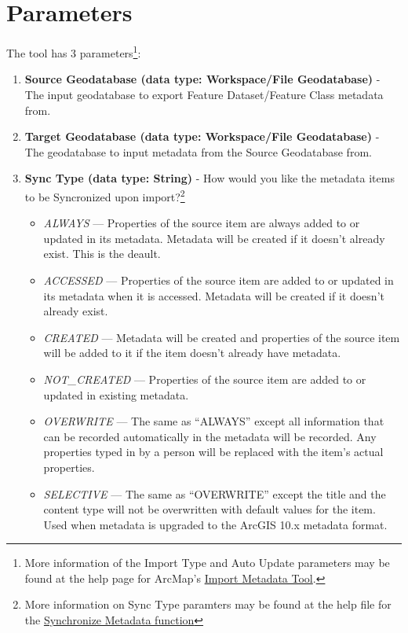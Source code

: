 \documentclass[openany]{book}
\providecommand{\tightlist}{%
  \setlength{\itemsep}{0pt}\setlength{\parskip}{0pt}}
\let\rmarkdownfootnote\footnote%
\def\footnote{\protect\rmarkdownfootnote}
\theoremstyle{definition}
\theoremstyle{definition}
\theoremstyle{definition}
\theoremstyle{remark}
\begin{document}
\section{Parameters}\label{parameters-13}

The tool has 3 parameters\footnote{More information of the Import Type
  and Auto Update parameters may be found at the help page for ArcMap's
  \href{http://desktop.arcgis.com/en/arcmap/latest/tools/conversion-toolbox/import-metadata.htm}{Import
  Metadata Tool}.}:

\begin{enumerate}
\def\labelenumi{\arabic{enumi}.}
\tightlist
\item
  \textbf{Source Geodatabase (data type: Workspace/File Geodatabase)} -
  The input geodatabase to export Feature Dataset/Feature Class metadata
  from.
\item
  \textbf{Target Geodatabase (data type: Workspace/File Geodatabase)} -
  The geodatabase to input metadata from the Source Geodatabase from.
\item
  \textbf{Sync Type (data type: String)} - How would you like the
  metadata items to be Syncronized upon import?\footnote{More
    information on Sync Type paramters may be found at the help file for
    the
    \href{http://desktop.arcgis.com/en/arcmap/latest/tools/conversion-toolbox/synchronize-metadata.htm}{Synchronize
    Metadata function}}

  \begin{itemize}
  \tightlist
  \item
    \emph{ALWAYS} --- Properties of the source item are always added to
    or updated in its metadata. Metadata will be created if it doesn't
    already exist. This is the deault.
  \item
    \emph{ACCESSED} --- Properties of the source item are added to or
    updated in its metadata when it is accessed. Metadata will be
    created if it doesn't already exist.
  \item
    \emph{CREATED} --- Metadata will be created and properties of the
    source item will be added to it if the item doesn't already have
    metadata.
  \item
    \emph{NOT\_CREATED} --- Properties of the source item are added to
    or updated in existing metadata.
  \item
    \emph{OVERWRITE} --- The same as ``ALWAYS'' except all information
    that can be recorded automatically in the metadata will be recorded.
    Any properties typed in by a person will be replaced with the item's
    actual properties.
  \item
    \emph{SELECTIVE} --- The same as ``OVERWRITE'' except the title and
    the content type will not be overwritten with default values for the
    item. Used when metadata is upgraded to the ArcGIS 10.x metadata
    format.
  \end{itemize}
\end{enumerate}
\end{document}
